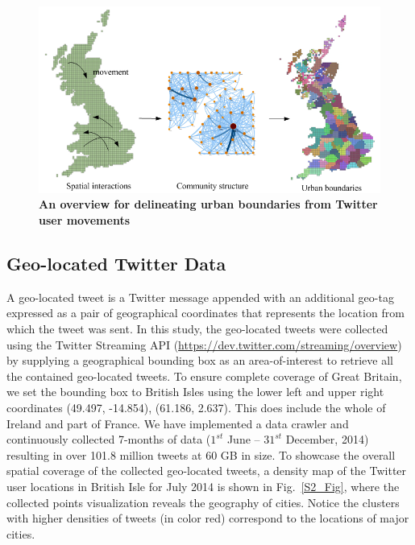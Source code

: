 \documentclass[10pt,letterpaper]{article}
\begin{document}
\begin{figure}[ht]
\includegraphics[width=1\linewidth]{./figure/PNG/S1_overview_Fig_2}
\caption{{\bf An overview for delineating urban boundaries from Twitter user movements}}
\label{S1_Fig}
\end{figure}

\subsection*{Geo-located Twitter Data}
A geo-located tweet is a Twitter message appended with an additional geo-tag expressed as a pair of geographical coordinates that represents the location from which the tweet was sent.
In this study, the geo-located tweets were collected using the Twitter Streaming API (\url{https://dev.twitter.com/streaming/overview}) by supplying a geographical bounding box as an area-of-interest to retrieve all the contained geo-located tweets.
To ensure complete coverage of Great Britain, we set the bounding box to British Isles using the lower left and upper right coordinates (49.497, -14.854), (61.186, 2.637). This does include the whole of Ireland and part of France.
We have implemented a data crawler and continuously collected 7-months of data ($1^{st}$ June – $31^{st}$ December, 2014) resulting in over 101.8 million tweets at 60 GB in size. 
To showcase the overall spatial coverage of the collected geo-located tweets, a density map of the Twitter user locations in British Isle for July 2014 is shown in Fig.~\ref{S2_Fig}, where the collected points visualization reveals the geography of cities. Notice the clusters with higher densities of tweets (in color red) correspond to the locations of major cities.
\end{document}
